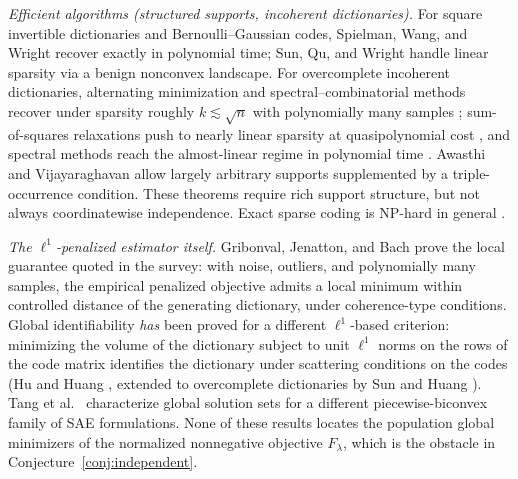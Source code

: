 \documentclass[11pt]{amsart}
\theoremstyle{plain}
\theoremstyle{definition}
\begin{document}
\emph{Efficient algorithms (structured supports, incoherent dictionaries).} For square invertible dictionaries and Bernoulli--Gaussian codes, Spielman, Wang, and Wright \cite{spielman2012} recover exactly in polynomial time; Sun, Qu, and Wright \cite{sun2017} handle linear sparsity via a benign nonconvex landscape. For overcomplete incoherent dictionaries, alternating minimization and spectral--combinatorial methods recover under sparsity roughly $k\lesssim\sqrt n$ with polynomially many samples \cite{agarwal2013,arora2014}; sum-of-squares relaxations push to nearly linear sparsity at quasipolynomial cost \cite{barak2015}, and spectral methods reach the almost-linear regime in polynomial time \cite{novikov2023}. Awasthi and Vijayaraghavan \cite{awasthi2018} allow largely arbitrary supports supplemented by a triple-occurrence condition. These theorems require rich support structure, but not always coordinatewise independence. Exact sparse coding is NP-hard in general \cite{tillmann2015}.

\emph{The $\ell^1$-penalized estimator itself.} Gribonval, Jenatton, and Bach \cite{gribonval2015} prove the local guarantee quoted in the survey: with noise, outliers, and polynomially many samples, the empirical penalized objective admits a local minimum within controlled distance of the generating dictionary, under coherence-type conditions. Global identifiability \emph{has} been proved for a different $\ell^1$-based criterion: minimizing the volume of the dictionary subject to unit $\ell^1$ norms on the rows of the code matrix identifies the dictionary under scattering conditions on the codes (Hu and Huang \cite{hu2023}, extended to overcomplete dictionaries by Sun and Huang \cite{sun2025}). Tang et al.~\cite{tang2025} characterize global solution sets for a different piecewise-biconvex family of SAE formulations. None of these results locates the population global minimizers of the normalized nonnegative objective $F_\lambda$, which is the obstacle in Conjecture~\ref{conj:independent}.
\end{document}
